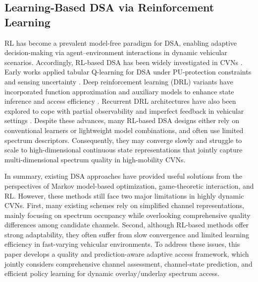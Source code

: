 \documentclass[journal]{IEEEtran}
\begin{document}
\subsection{Learning-Based DSA via Reinforcement Learning}
RL has become a prevalent model-free paradigm for DSA\cite{ref28}, enabling adaptive decision-making via agent–environment interactions in dynamic vehicular scenarios. Accordingly, RL-based DSA has been widely investigated in CVNs \cite{ref29}. Early works applied tabular Q-learning for DSA under PU-protection constraints and sensing uncertainty \cite{ref30}. Deep reinforcement learning (DRL) variants have incorporated function approximation and auxiliary models  to enhance state inference and access efficiency \cite{ref31}. Recurrent DRL architectures  have also been explored to cope with partial observability and imperfect feedback in vehicular settings \cite{ref32}. Despite these advances, many RL-based DSA designs either rely on conventional learners or lightweight model combinations, and often use limited spectrum descriptors. Consequently, they may converge slowly and struggle to scale to high-dimensional continuous state representations that jointly capture multi-dimensional spectrum quality in high-mobility CVNs.\par
In summary, existing DSA approaches have provided useful solutions from the perspectives of Markov model-based optimization, game-theoretic interaction, and RL. However, these methods still face two major limitations in highly dynamic CVNs. First, many existing schemes rely on simplified channel representations, mainly focusing on spectrum occupancy while overlooking comprehensive quality differences among candidate channels. Second, although RL-based methods offer strong adaptability, they often suffer from slow convergence and limited learning efficiency in fast-varying vehicular environments. To address these issues, this paper develops a quality and prediction-aware adaptive access framework, which jointly considers comprehensive channel assessment, channel-state prediction, and efficient policy learning for dynamic overlay/underlay spectrum access.
\end{document}
